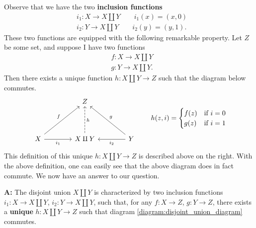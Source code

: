 \begin{example}
    Observe that we have the two \textbf{inclusion functions}
    \begin{align*}
        &i_1: X \to X \amalg Y \qquad i_1(x) = (x, 0)\\
        &i_2: Y \to X \amalg Y \qquad i_2(y) = (y, 1).
    \end{align*}
    These two functions are equipped with the following remarkable property. 
    Let $Z$ be some set, and suppose I have two functions
    \begin{align*}
        &f: X \to X \amalg Y \\
        &g: Y \to X \amalg Y.
    \end{align*}
    Then there exists a unique function $h: X \amalg Y \to Z$ such that the diagram below 
    commutes. 
    \begin{align}\label{diagram:disjoint_union_diagram}
        \begin{tikzcd}[column sep = 1.4cm, row sep = 1.4cm
            ,ampersand replacement=\&]
            \&
            Z 
            \arrow[<-, dr,  "g"]
            \arrow[<-, dl, swap,"f"]
            \arrow[<-, d, dashed, "h"]
            \&
            \\
            X 
            \& 
            \arrow[<-, l, "i_1"]
            X \amalg Y 
            \arrow[<-, r, swap, "i_2"]
            \&
            Y
        \end{tikzcd}
        \qquad
        h(z, i)
        =
        \begin{cases}
            f(z) & \text{if } i = 0\\ 
            g(z) & \text{if } i = 1
        \end{cases}
    \end{align}
    This definition of this unique $h: X \amalg Y \to Z$ is described above on the right.
    With the above definition, one can easily see that the above diagram does in fact commute.
    We now have an answer to our question.
    \begin{center}
        \begin{minipage}{0.8\textwidth}
            \textbf{A:} The disjoint union $X \amalg Y$ is characterized by two 
            inclusion functions $i_1: X \to X \amalg Y$, $i_2: Y \to X \amalg Y$, 
            such that, for any $f: X \to Z$, $g: Y \to Z$, there exists a \textbf{unique} 
            $h: X \amalg Y \to Z$ such that diagram \ref{diagram:disjoint_union_diagram} 
            commutes.
        \end{minipage}
    \end{center}
\end{example}

